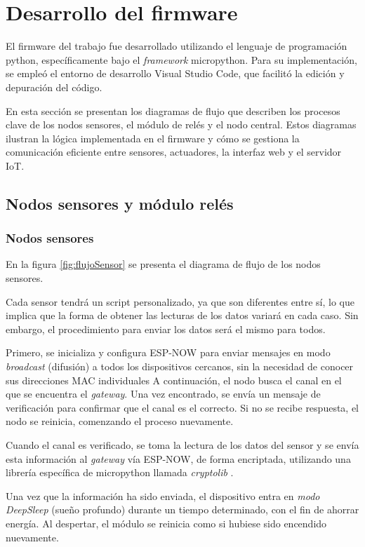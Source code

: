 \section{Desarrollo del firmware}

El firmware del trabajo fue desarrollado utilizando el lenguaje de programación python, específicamente bajo el \textit{framework} micropython. Para su implementación, se empleó el entorno de desarrollo Visual Studio Code, que facilitó la edición y depuración del código.

En esta sección se presentan los diagramas de flujo que describen los procesos clave de los nodos sensores, el módulo de relés y el nodo central. Estos diagramas ilustran la lógica implementada en el firmware y cómo se gestiona la comunicación eficiente entre sensores, actuadores, la interfaz web y el servidor IoT.

\subsection{Nodos sensores y módulo relés}

\subsubsection{Nodos sensores}

En la figura \ref{fig:flujoSensor} se presenta el diagrama de flujo de los nodos sensores. 

Cada sensor tendrá un script personalizado, ya que son diferentes entre sí, lo que implica que la forma de obtener las lecturas de los datos variará en cada caso. Sin embargo, el procedimiento para enviar los datos será el mismo para todos.

Primero, se inicializa y configura ESP-NOW para enviar mensajes en modo \textit{broadcast} (difusión) a todos los dispositivos cercanos, sin la necesidad de conocer sus direcciones MAC individuales
A continuación, el nodo busca el canal en el que se encuentra el \textit{gateway}. Una vez encontrado, se envía un mensaje de verificación para confirmar que el canal es el correcto. Si no se recibe respuesta, el nodo se reinicia, comenzando el proceso nuevamente.

Cuando el canal es verificado, se toma la lectura de los datos del sensor y se envía esta información al \textit{gateway} vía ESP-NOW, de forma encriptada, utilizando una librería específica de micropython llamada \textit{cryptolib} \citep{docsmpy}.

Una vez que la información ha sido enviada, el dispositivo entra en \textit{modo DeepSleep} (sueño profundo) durante un tiempo determinado, con el fin de ahorrar energía. Al despertar, el módulo se reinicia como si hubiese sido encendido nuevamente.

